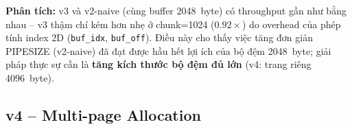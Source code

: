 \documentclass[12pt,a4paper]{article}
\newcommand{\code}[1]{\texttt{#1}}
\begin{document}
\textbf{Phân tích:} v3 và v2-naive (cùng buffer 2048~byte) có throughput gần như bằng nhau
-- v3 thậm chí kém hơn nhẹ ở chunk=1024 ($0.92\times$) do overhead của phép tính
index 2D (\code{buf\_idx}, \code{buf\_off}). Điều này cho thấy việc tăng đơn giản
PIPESIZE (v2-naive) đã đạt được hầu hết lợi ích của bộ đệm 2048~byte; giải pháp
thực sự cần là \textbf{tăng kích thước bộ đệm đủ lớn} (v4: trang riêng 4096~byte).




\subsection{v4 -- Multi-page Allocation}
\end{document}

